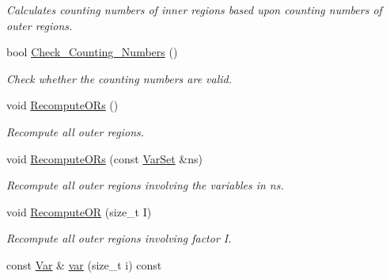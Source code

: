 \begin{CompactItemize}
\begin{CompactList}\small\item\em Calculates counting numbers of inner regions based upon counting numbers of outer regions. \item\end{CompactList}\item 
\hypertarget{classdai_1_1RegionGraph_16b1c05909e5bb52c472fd15e9791f90}{
bool \hyperlink{classdai_1_1RegionGraph_16b1c05909e5bb52c472fd15e9791f90}{Check\_\-Counting\_\-Numbers} ()}
\label{classdai_1_1RegionGraph_16b1c05909e5bb52c472fd15e9791f90}

\begin{CompactList}\small\item\em Check whether the counting numbers are valid. \item\end{CompactList}\item 
\hypertarget{classdai_1_1RegionGraph_642af0274d25e08fa4c2ec92314477ee}{
void \hyperlink{classdai_1_1RegionGraph_642af0274d25e08fa4c2ec92314477ee}{RecomputeORs} ()}
\label{classdai_1_1RegionGraph_642af0274d25e08fa4c2ec92314477ee}

\begin{CompactList}\small\item\em Recompute all outer regions. \item\end{CompactList}\item 
\hypertarget{classdai_1_1RegionGraph_5e867cca791a16e5538b175eb0193b97}{
void \hyperlink{classdai_1_1RegionGraph_5e867cca791a16e5538b175eb0193b97}{RecomputeORs} (const \hyperlink{classdai_1_1VarSet}{VarSet} \&ns)}
\label{classdai_1_1RegionGraph_5e867cca791a16e5538b175eb0193b97}

\begin{CompactList}\small\item\em Recompute all outer regions involving the variables in ns. \item\end{CompactList}\item 
\hypertarget{classdai_1_1RegionGraph_04b34775be9a380334f16c61505e9e54}{
void \hyperlink{classdai_1_1RegionGraph_04b34775be9a380334f16c61505e9e54}{RecomputeOR} (size\_\-t I)}
\label{classdai_1_1RegionGraph_04b34775be9a380334f16c61505e9e54}

\begin{CompactList}\small\item\em Recompute all outer regions involving factor I. \item\end{CompactList}\item 
\hypertarget{classdai_1_1FactorGraph_87036afc568a8658dee9bff52f8fd3e1}{
const \hyperlink{classdai_1_1Var}{Var} \& \hyperlink{classdai_1_1FactorGraph_87036afc568a8658dee9bff52f8fd3e1}{var} (size\_\-t i) const }
\label{classdai_1_1FactorGraph_87036afc568a8658dee9bff52f8fd3e1}


\end{CompactItemize}
